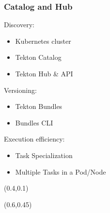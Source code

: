\documentclass[aspectratio=169,11pt,hyperref={colorlinks=true}]{beamer}
\begin{document}
\begin{grayframe}
  \frametitle{Catalog and Hub}
  Discovery:
  \begin{itemize}
    \item Kubernetes cluster
    \item Tekton Catalog
    \item Tekton Hub \& API
  \end{itemize}
  \vspace{0.03\paperheight}
  Versioning:
  \begin{itemize}
    \item Tekton Bundles
    \item Bundles CLI
  \end{itemize}
  \vspace{0.03\paperheight}
  Execution efficiency:
  \begin{itemize}
    \item Task Specialization
    \item Multiple Tasks in a Pod/Node
  \end{itemize}
  \begin{textblock*}{0.4\paperwidth}(0.4\paperwidth,0.1\paperheight)
  \end{textblock*}
  \begin{textblock*}{0.3\paperwidth}(0.6\paperwidth,0.45\paperheight)

\end{textblock*}
\end{grayframe}
\end{document}
